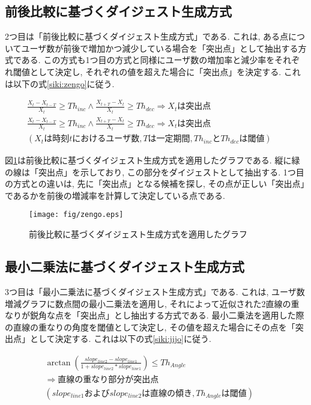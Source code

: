 \newpage

\subsection{前後比較に基づくダイジェスト生成方式}\label{subsec:pro-zengo}
2つ目は「前後比較に基づくダイジェスト生成方式」である. これは, ある点についてユーザ数が前後で増加かつ減少している場合を「突出点」として抽出する方式である. この方式も1つ目の方式と同様にユーザ数の増加率と減少率をそれぞれ閾値として決定し, それぞれの値を超えた場合に「突出点」を決定する. これは以下の式\ref{siki:zengo}に従う.

\begin{eqnarray}
  \frac{X_{t}-X_{t-T}}{X_{t}} \geq Th_{inc} \wedge \frac{X_{t+T}-X_{t}}{X_{t}} \geq Th_{dec} \Rightarrow X_{t}は突出点 \nonumber \\
  \frac{X_{t}-X_{t-T}}{X_{t}} \geq Th_{inc} \wedge \frac{X_{t+T}-X_{t}}{X_{t}} \geq Th_{dec} \Rightarrow X_{t}は突出点 \nonumber \\
  (X_{t}は時刻tにおけるユーザ数, Tは一定期間, Th_{inc}とTh_{dec}は閾値) &&
  \label{siki:zengo}
\end{eqnarray}

図\ref{fig:zengo}は前後比較に基づくダイジェスト生成方式を適用したグラフである. 縦に緑の線は「突出点」を示しており, この部分をダイジェストとして抽出する. 1つ目の方式との違いは, 先に「突出点」となる候補を探し, その点が正しい「突出点」であるかを前後の増減率を計算して決定している点である.

\begin{figure}[h]
  \centering
  \texttt{[image: fig/zengo.eps]}
  \caption{前後比較に基づくダイジェスト生成方式を適用したグラフ}
  \label{fig:zengo}
\end{figure}

\newpage

\subsection{最小二乗法に基づくダイジェスト生成方式}\label{subsec:pro-jijo}
3つ目は「最小二乗法に基づくダイジェスト生成方式」である. これは, ユーザ数増減グラフに数点間の最小二乗法を適用し, それによって近似された2直線の重なりが鋭角な点を「突出点」とし抽出する方式である. 最小二乗法を適用した際の直線の重なりの角度を閾値として決定し, その値を超えた場合にその点を「突出点」として決定する. これは以下の式\ref{siki:jijo}に従う.

\begin{eqnarray}
  \arctan \left(\frac{slope_{line2} - slope_{line1}}{1+slope_{line2}*slope_{line1}}\right) \leq Th_{Angle} \nonumber \\
  \Rightarrow 直線の重なり部分が突出点 \nonumber \\
  (slope_{line1}およびslope_{line2}は直線の傾き, Th_{Angle}は閾値) &&
  \label{siki:jijo}
\end{eqnarray}


